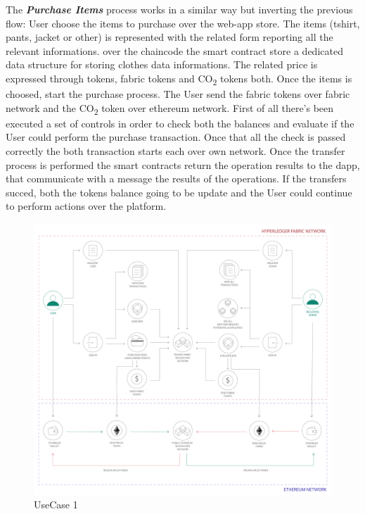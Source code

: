 \begin{outline}[enumerate]
    \1 The \textit{\bf{Purchase Items}} process works in a similar way but inverting the previous flow:
    \2 User choose the items to purchase over the web-app store. The items (tshirt, pants, jacket or other) 
    is represented with the related form reporting all the relevant informations. over the chaincode
    the smart contract store a dedicated data structure for storing clothes data informations. 
    The related price is expressed through tokens, fabric tokens and CO\textsubscript{2} tokens both. 
    \2 Once the items is choosed, start the purchase process. The User send the fabric tokens over fabric
    network and the CO\textsubscript{2} token over ethereum network. First of all there's been executed
    a set of controls in order to check both the balances and evaluate if the User could perform
    the purchase transaction. Once that all the check is passed correctly the both transaction starts
    each over own network. Once the transfer process is performed the smart contracts return the 
    operation results to the dapp, that communicate with a message the results of the operations.
    \2 If the transfers succed, both the tokens balance going to be update and the User could
    continue to perform actions over the platform.    
\end{outline}

\begin{figure}[h!]
	\centering
	\includegraphics[totalheight=15cm]{img/use_case1.png}
	\caption{UseCase 1}
	\label{fig:usecase1}
\end{figure}


